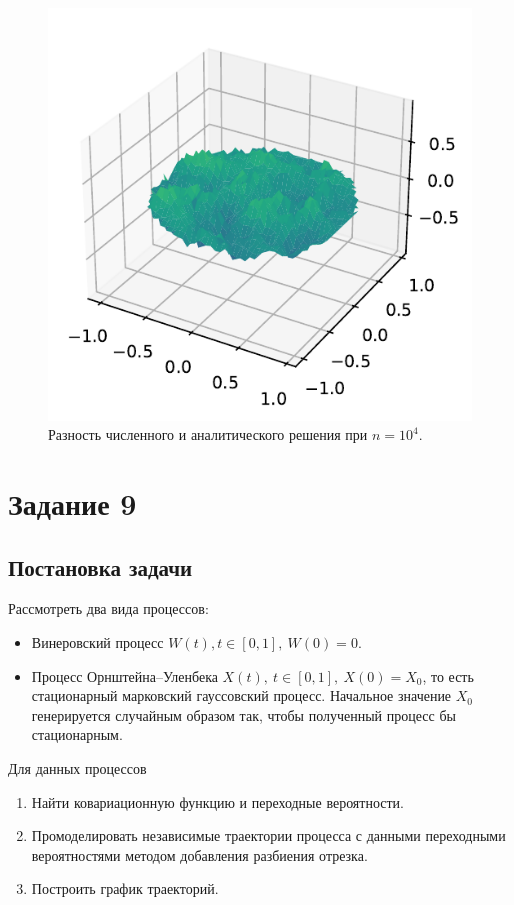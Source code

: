 \documentclass[16pt]{article}
\begin{document}
\begin{figure}[h]
	\center
	\includegraphics[scale=0.7]{8_3.pdf}
	\caption{Разность численного и аналитического решения при $n = 10^4$.}
\end{figure}

\newpage
\section{Задание 9}
\subsection{Постановка задачи}
Рассмотреть два вида процессов:
\begin{itemize}
	\item Винеровский процесс $W(t), t \in [0, 1], \ W(0) = 0.$
	\item Процесс Орнштейна--Уленбека $X(t),\ t \in [0, 1], \ X(0) = X_0$, то есть стационарный марковский гауссовский процесс. Начальное значение $X_0$ генерируется случайным образом так, чтобы полученный процесс бы стационарным.
\end{itemize}

Для данных процессов
\begin{enumerate}
	\item Найти ковариационную функцию и переходные вероятности.
	\item Промоделировать независимые траектории процесса с данными переходными вероятностями методом добавления разбиения отрезка.
	\item Построить график траекторий.
\end{enumerate}
\end{document}
